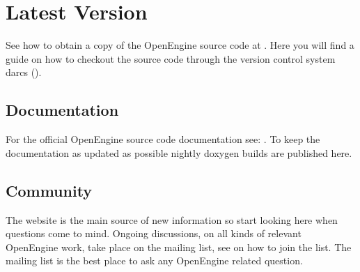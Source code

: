\section{Latest Version}
See how to obtain a copy of the OpenEngine source code at
. Here you will find a guide on
how to checkout the source code through the version control system
darcs ().

\subsection{Documentation}
For the official OpenEngine source code documentation see:
. To keep the
documentation as updated as possible nightly doxygen builds are
published here.



\subsection{Community}
The website is the main source of new information so start looking
here when questions come to mind. Ongoing discussions, on
all kinds of relevant OpenEngine work, take place on the
mailing list, see  on how
to join the list. The mailing list is the best place to ask any
OpenEngine related question.
